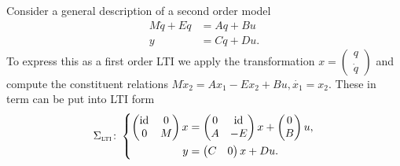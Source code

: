 \begin{example}
    Consider a general description of a second order model
    \begin{align*}
        M \ddot{q} + E \dot{q} &= A q + B u \\
        y &= C q + D u.
    \end{align*}
    To express this as a first order \ac{LTI} we apply the transformation $x = \begin{pmatrix}
        q \\
        \dot{q}
    \end{pmatrix}$
    and compute the constituent relations $M \dot{x}_2 = A x_1 - E x_2 + Bu, \dot{x_1} = x_2$.
    These in term can be put into \ac{LTI} form
    \begin{equation*}
        \Sigma_{\textnormal{\scshape lti}} \colon \left\lbrace
        \begin{aligned}
            \begin{pmatrix}
                \text{id}_{} & 0 \\
                0 & M
            \end{pmatrix} x &= \begin{pmatrix}
                0 & \text{id}_{} \\
                A & -E
            \end{pmatrix} x + \begin{pmatrix}
                0 \\
                B
            \end{pmatrix} u, \\
            y &= \begin{pmatrix}
                C & 0
            \end{pmatrix} x + D u.
        \end{aligned}
        \right.
    \end{equation*}
\end{example}

